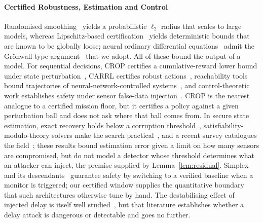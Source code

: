 \documentclass[conference,letterpaper,10pt]{IEEEtran}   %
\begin{document}
\paragraph{Certified Robustness, Estimation and Control}
Randomised smoothing~\cite{cohen2019smoothing,salman2019provably} yields a
probabilistic $\ell_2$ radius that scales to large models, whereas
Lipschitz-based certification~\cite{pauli2022training,zhang2022rethinking}
yields deterministic bounds that are known to be globally loose; neural
ordinary differential equations~\cite{chen2018neuralode} admit the Gr\"onwall-type
argument~\cite{yan2020robustnode} that we adopt. All of these bound the output
of a model. For sequential decisions, CROP certifies a cumulative-reward lower
bound under state perturbation~\cite{wu2022crop}, CARRL certifies robust
actions~\cite{everett2021carrl}, reachability tools bound trajectories of
neural-network-controlled systems~\cite{ivanov2019verisig,tran2020nnv}, and
control-theoretic work establishes safety under sensor false-data
injection~\cite{li2022lqg}. CROP is the nearest analogue to a certified mission
floor, but it certifies a policy against a given perturbation ball and does not
ask where that ball comes from. In secure state estimation, exact recovery
holds below a corruption threshold~\cite{fawzi2014secure},
satisfiability-modulo-theory solvers make the search
practical~\cite{shoukry2017smt}, and a recent survey catalogues the
field~\cite{ding2021survey}; these results bound estimation error given a limit
on how many sensors are compromised, but do not model a detector whose
threshold determines what an attacker can inject, the premise supplied by
Lemma~\ref{lem:residual}. Simplex and its
descendants~\cite{sha2001simplex,mehmood2022blackbox,cofer2020rta} guarantee
safety by switching to a verified baseline when a monitor is triggered; our
certified window supplies the quantitative boundary that such architectures
otherwise tune by hand. The destabilising effect of injected delay is itself
well studied~\cite{lou2019timedelay,etd2023uav,datamut2026}, but that
literature establishes whether a delay attack is dangerous or detectable and
goes no further.
\end{document}

